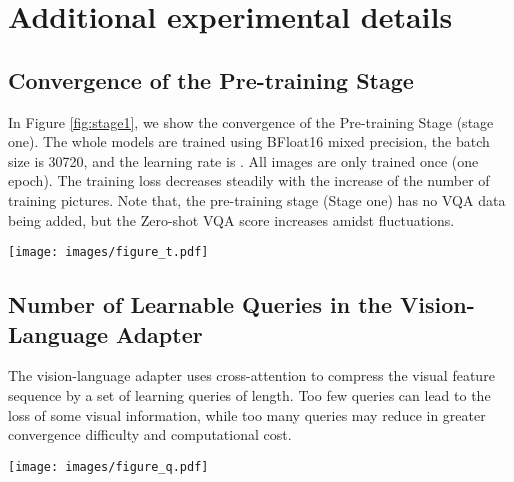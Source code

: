 \documentclass{article}
\begin{document}
\section{Additional experimental details}

\subsection{Convergence of the Pre-training Stage}
\label{app:first_stage}

In Figure \ref{fig:stage1}, we show the convergence of the Pre-training Stage (stage one). The whole models are trained using BFloat16
mixed precision, the batch size is 30720, and the learning rate is . All images are only trained once (one epoch). The training loss decreases steadily with the increase of the number of training pictures. Note that, the pre-training stage (Stage one) has no VQA data being added, but the Zero-shot VQA score increases amidst fluctuations.

\begin{figure*}[ht]
\centering
\texttt{[image: images/figure\_t.pdf]}
   \caption{Visualization of the Convergence of the Pre-training Stage}
\label{fig:stage1}
\end{figure*}

\subsection{Number of Learnable Queries in the Vision-Language Adapter}
\label{app:n_queries}

The vision-language adapter uses cross-attention to compress the visual feature sequence by a set of learning queries of length. Too few queries can lead to the loss of some visual information, while too many queries may reduce in greater convergence difficulty and computational cost.

\begin{figure*}[ht]
\centering
\texttt{[image: images/figure\_q.pdf]}
   \caption{Visualization of the training loss when using different compressed feature lengths of the vision-language adapter. The left depicts the initial training loss (within 50 steps), and the right depicts the loss in convergence (1k-5k steps). In the legend, L64 denotes that the adapter uses 64 queries to compress the visual feature sequence to a fixed length of 64, and so on. The loss curves have been smoothed to avoid shading owing to fluctuations.}
\label{fig:ablation_adapter}
\end{figure*}
\end{document}
